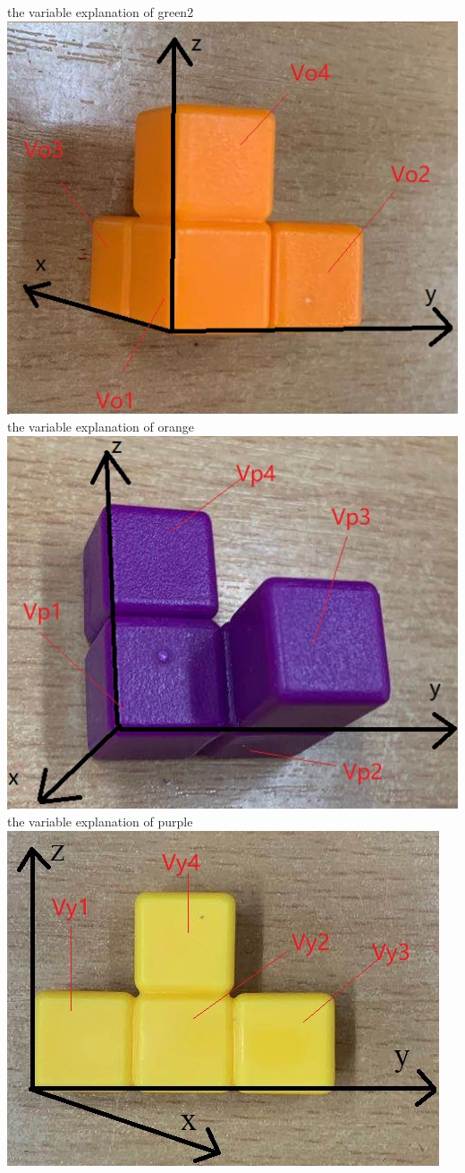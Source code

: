 \begin{center}
the variable explanation of green2
\includegraphics{3Dorange.jpg}\\
the variable explanation of orange
\includegraphics{3Dpurple.jpg}\\
the variable explanation of purple
\includegraphics{3Dyellow.jpg}\\

\end{center}

